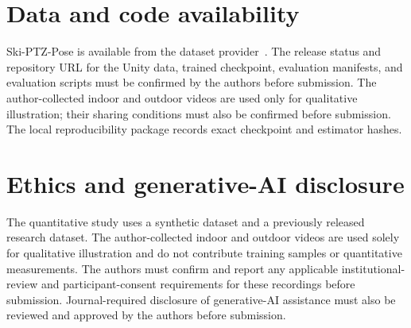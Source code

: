 \documentclass[preprint,12pt]{elsarticle}
\begin{document}
\section*{Data and code availability}
Ski-PTZ-Pose is available from the dataset provider~\cite{ski_poseptz_dataset}. The release status and repository URL for the Unity data, trained checkpoint, evaluation manifests, and evaluation scripts must be confirmed by the authors before submission. The author-collected indoor and outdoor videos are used only for qualitative illustration; their sharing conditions must also be confirmed before submission. The local reproducibility package records exact checkpoint and estimator hashes.

\section*{Ethics and generative-AI disclosure}
The quantitative study uses a synthetic dataset and a previously released research dataset. The author-collected indoor and outdoor videos are used solely for qualitative illustration and do not contribute training samples or quantitative measurements. The authors must confirm and report any applicable institutional-review and participant-consent requirements for these recordings before submission. Journal-required disclosure of generative-AI assistance must also be reviewed and approved by the authors before submission.

\setlength{\bibsep}{4pt}


\end{document}
